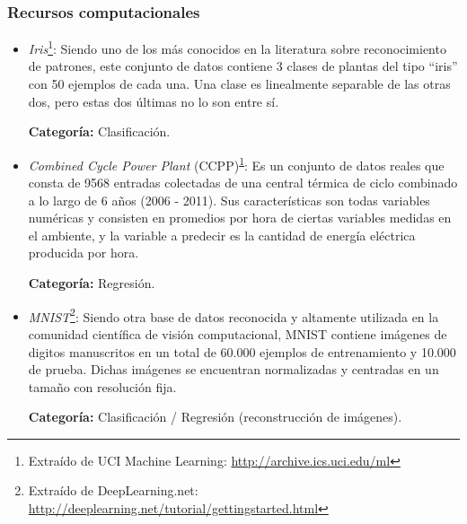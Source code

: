 \begin{frame}[t,fragile]
\frametitle {Recursos computacionales}

\begin{itemize}
	\item \textit{Iris}\footnote{\label{ref-uci}\scriptsize{Extraído de UCI Machine Learning: \url{http://archive.ics.uci.edu/ml}}}: Siendo uno de los más conocidos en la literatura sobre reconocimiento de patrones, este conjunto de datos contiene 3 clases de plantas del tipo ``iris'' con 50 ejemplos de cada una. Una clase es linealmente separable de las otras dos, pero estas dos últimas no lo son entre sí.
	
	\textbf{Categoría:} Clasificación.
	
	\item \textit{Combined Cycle Power Plant} (CCPP)\textsuperscript{\ref{ref-uci}}: Es un conjunto de datos reales que consta de 9568 entradas colectadas de una central térmica de ciclo combinado a lo largo de 6 años (2006 - 2011). Sus características son todas variables numéricas y consisten en promedios por hora de ciertas variables medidas en el ambiente, y la variable a predecir es la cantidad de energía eléctrica producida por hora.
	
	\textbf{Categoría:} Regresión.
	
	\item \textit{MNIST}\footnote{\scriptsize{Extraído de DeepLearning.net: \url{http://deeplearning.net/tutorial/gettingstarted.html}}}: Siendo otra base de datos reconocida y altamente utilizada en la comunidad científica de visión computacional, MNIST contiene imágenes de digitos manuscritos en un total de 60.000 ejemplos de entrenamiento y 10.000 de prueba. Dichas imágenes se encuentran normalizadas y centradas en un tamaño con resolución fija.
	
	
	
	\textbf{Categoría:} Clasificación / Regresión (reconstrucción de imágenes).
	
\end{itemize}
		
\end{frame}


